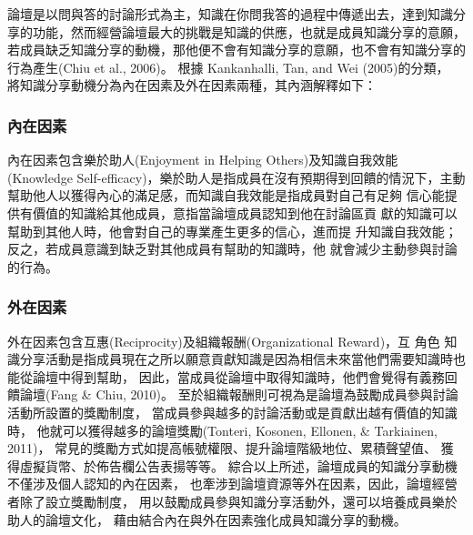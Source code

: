 論壇是以問與答的討論形式為主，知識在你問我答的過程中傳遞出去，達到知識分享的功能，然而經營論壇最大的挑戰是知識的供應，也就是成員知識分享的意願，若成員缺乏知識分享的動機，那他便不會有知識分享的意願，也不會有知識分享的行為產生(Chiu et al., 2006)。
 根據 Kankanhalli, Tan, and Wei (2005)的分類，
 將知識分享動機分為內在因素及外在因素兩種，其內涵解釋如下：




\subsubsection{內在因素} 
內在因素包含樂於助人(Enjoyment in Helping Others)及知識自我效能
(Knowledge Self-efficacy)，樂於助人是指成員在沒有預期得到回饋的情況下，主動幫助他人以獲得內心的滿足感，而知識自我效能是指成員對自己有足夠
信心能提供有價值的知識給其他成員，意指當論壇成員認知到他在討論區貢
獻的知識可以幫助到其他人時，他會對自己的專業產生更多的信心，進而提
升知識自我效能；反之，若成員意識到缺乏對其他成員有幫助的知識時，他
就會減少主動參與討論的行為。

\subsubsection{外在因素} 
外在因素包含互惠(Reciprocity)及組織報酬(Organizational Reward)，互
角色 知識分享活動是指成員現在之所以願意貢獻知識是因為相信未來當他們需要知識時也能從論壇中得到幫助，
因此，當成員從論壇中取得知識時，他們會覺得有義務回饋論壇(Fang \& Chiu, 2010)。
至於組織報酬則可視為是論壇為鼓勵成員參與討論活動所設置的獎勵制度，
當成員參與越多的討論活動或是貢獻出越有價值的知識時，
他就可以獲得越多的論壇獎勵(Tonteri, Kosonen, Ellonen, \& Tarkiainen, 2011)，
常見的獎勵方式如提高帳號權限、提升論壇階級地位、累積聲望值、
獲得虛擬貨幣、於佈告欄公告表揚等等。 
 綜合以上所述，論壇成員的知識分享動機不僅涉及個人認知的內在因素，
 也牽涉到論壇資源等外在因素，因此，論壇經營者除了設立獎勵制度，
 用以鼓勵成員參與知識分享活動外，還可以培養成員樂於助人的論壇文化，
 藉由結合內在與外在因素強化成員知識分享的動機。



\EndChapter